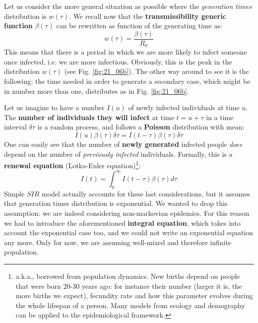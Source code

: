\documentclass[../main/main.tex]{subfiles}
\begin{document}
Let us consider the more general situation as possible where the \textit{generation times} distribution is $w(\tau)$. We recall now that the \textbf{transmissibility generic function} $\beta(\tau)$ can be rewritten as function of the generating time as:
\begin{equation}
    w(\tau) = \frac{\beta(\tau)}{R_0}
    \label{eqn:w(tau)}
\end{equation}
This means that there is a period in which we are more likely to infect someone once infected, i.e. we are more infectious. Obviously, this is the peak in the distribution $w(\tau)$ (see Fig. \ref{fig:21_06b}).  The other way around to see it is the following: the time needed in order to generate a secondary case, which might be in number more than one, distributes as in Fig. \ref{fig:21_06b}.

Let us imagine to have a number $I(u)$ of newly infected individuals at time $u$. The \textbf{number of individuals they will infect} at time $t = u + \tau$ in a time interval $\delta \tau$ is a random process, and follows a \textbf{Poisson} distribution with mean:
\begin{equation}
    I(u) \beta (\tau) \delta \tau = I(t-\tau) \beta (\tau) \delta \tau
\end{equation}
One can easily see that the number of \textbf{newly generated} infected people \textit{does} depend on the number of \textit{previously infected} individuals. Formally, this is a \textbf{renewal equation} (Lotka-Euler equation)\footnote{a.k.a., borrowed from population dynamics. New births depend on people that were born 20-30 years ago: for instance their number (larger it is, the more births we expect), fecundity rate and how this parameter evolves during the whole lifespan of a person. Many models from ecology and demography can be applied to the epidemiological framework.}:
\begin{equation}
    I(t) = \int_0^\infty I(t - \tau) \beta(\tau) d \tau
\end{equation}
Simple $SIR$ model actually accounts for these last considerations, but it assumes that generation times distribution is exponential. We wanted to drop this assumption: we are indeed considering non-markovian epidemics. For this reason we had to introduce the aforementioned \textbf{integral equation}, which takes into account the exponential case too, and we could not write an exponential equation any more. Only for now, we are assuming well-mixed and therefore infinite population.
\end{document}
